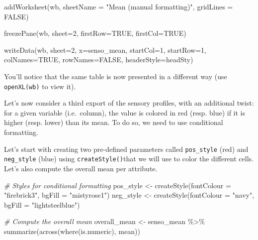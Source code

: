 \documentclass[
]{krantz}
\makeatletter
\newenvironment{Shaded}{\begin{snugshade}}{\end{snugshade}}
\newcommand{\AttributeTok}[1]{\textcolor[rgb]{0.61,0.61,0.61}{#1}}
\newcommand{\CommentTok}[1]{\textcolor[rgb]{0.37,0.37,0.37}{\textit{#1}}}
\newcommand{\ConstantTok}[1]{\textcolor[rgb]{0,0,0}{#1}}
\newcommand{\DecValTok}[1]{\textcolor[rgb]{0.06,0.06,0.06}{#1}}
\newcommand{\FunctionTok}[1]{\textcolor[rgb]{0,0,0}{#1}}
\newcommand{\NormalTok}[1]{#1}
\newcommand{\OtherTok}[1]{\textcolor[rgb]{0.37,0.37,0.37}{#1}}
\newcommand{\SpecialCharTok}[1]{\textcolor[rgb]{0,0,0}{#1}}
\newcommand{\StringTok}[1]{\textcolor[rgb]{0.5,0.5,0.5}{#1}}
\newenvironment{kframe}{%
\medskip{}
\setlength{\fboxsep}{.8em}
 \def\at@end@of@kframe{}%
 \ifinner\ifhmode%
  \def\at@end@of@kframe{\end{minipage}}%
  \begin{minipage}{\columnwidth}%
 \fi\fi%
 \def\FrameCommand##1{\hskip\@totalleftmargin \hskip-\fboxsep
 \colorbox{shadecolor}{##1}\hskip-\fboxsep
     \hskip-\linewidth \hskip-\@totalleftmargin \hskip\columnwidth}%
 \MakeFramed {\advance\hsize-\width
   \@totalleftmargin\z@ \linewidth\hsize
   \@setminipage}}%
 {\par\unskip\endMakeFramed%
 \at@end@of@kframe}
\renewenvironment{Shaded}{\begin{kframe}}{\end{kframe}}
\makeatother
\begin{document}
\begin{Shaded}
\begin{Highlighting}[]
\FunctionTok{addWorksheet}\NormalTok{(wb, }\AttributeTok{sheetName =} \StringTok{"Mean (manual formatting)"}\NormalTok{, }\AttributeTok{gridLines =} \ConstantTok{FALSE}\NormalTok{)}

\FunctionTok{freezePane}\NormalTok{(wb, }\AttributeTok{sheet=}\DecValTok{2}\NormalTok{, }\AttributeTok{firstRow=}\ConstantTok{TRUE}\NormalTok{, }\AttributeTok{firstCol=}\ConstantTok{TRUE}\NormalTok{)}

\FunctionTok{writeData}\NormalTok{(wb, }\AttributeTok{sheet=}\DecValTok{2}\NormalTok{, }\AttributeTok{x=}\NormalTok{senso\_mean, }
          \AttributeTok{startCol=}\DecValTok{1}\NormalTok{, }\AttributeTok{startRow=}\DecValTok{1}\NormalTok{, }
          \AttributeTok{colNames=}\ConstantTok{TRUE}\NormalTok{, }\AttributeTok{rowNames=}\ConstantTok{FALSE}\NormalTok{, }
          \AttributeTok{headerStyle=}\NormalTok{headSty)}
\end{Highlighting}
\end{Shaded}

You'll notice that the same table is now presented in a different way (use \texttt{openXL(wb)} to view it).

Let's now consider a third export of the sensory profiles, with an additional twist: for a given variable (i.e.~column), the value is colored in red (resp. blue) if it is higher (resp. lower) than its mean. To do so, we need to use conditional formatting.

Let's start with creating two pre-defined parameters called \texttt{pos\_style} (red) and \texttt{neg\_style} (blue) using \texttt{createStyle()}that we will use to color the different cells. Let's also compute the overall mean per attribute.

\begin{Shaded}
\begin{Highlighting}[]
\CommentTok{\# Styles for conditional formatting}
\NormalTok{pos\_style }\OtherTok{\textless{}{-}} \FunctionTok{createStyle}\NormalTok{(}\AttributeTok{fontColour =} \StringTok{"firebrick3"}\NormalTok{, }
                         \AttributeTok{bgFill =} \StringTok{"mistyrose1"}\NormalTok{)}
\NormalTok{neg\_style }\OtherTok{\textless{}{-}} \FunctionTok{createStyle}\NormalTok{(}\AttributeTok{fontColour =} \StringTok{"navy"}\NormalTok{, }
                         \AttributeTok{bgFill =} \StringTok{"lightsteelblue"}\NormalTok{)}

\CommentTok{\# Compute the overall mean}
\NormalTok{overall\_mean }\OtherTok{\textless{}{-}}\NormalTok{ senso\_mean }\SpecialCharTok{\%\textgreater{}\%} 
  \FunctionTok{summarize}\NormalTok{(}\FunctionTok{across}\NormalTok{(}\FunctionTok{where}\NormalTok{(is.numeric), mean))}
\end{Highlighting}
\end{Shaded}
\end{document}
